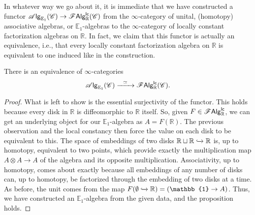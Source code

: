 \documentclass[../text]{subfiles}
\begin{document}
\begin{construction}
    In whatever way we go about it, it is immediate that we have constructed a functor $\mathscr{A} \mathsf{lg}_{\mathbb{E}_1}(\mathscr{C}) \rightarrow \mathscr{F} \mathsf{Alg}^{\mathsf{lc}}_{\mathbb{R}} (\mathscr{C})$ from the $\infty$-category of unital, (homotopy) associative algebras, or $\mathbb{E}_1$-algebras to the $\infty$-category of locally constant factorization algebras on $\mathbb{R}$. In fact, we claim that this functor is actually an equivalence, i.e., that every locally constant factorization algebra on $\mathbb{R}$ is equivalent to one induced like in the construction.
\end{construction}

\begin{proposition}\label{prop:R_gives_E1}
    There is an equivalence of $\infty$-categories
    \begin{equation}
        \alg{\mathbb{E}_1}(\catC) \xrightarrow{\ \ \simeq \ \ } \lcfa_{\mathbb{R}} (\catC).
    \end{equation}
\end{proposition}

\begin{proof}
    What is left to show is the essential surjectivity of the functor. This holds because every disk in $\mathbb{R}$ is diffeomorphic to $\mathbb{R}$ itself. So, given $F \in \mathscr{F} \mathsf{Alg}^{\mathsf{lc}}_{\mathbb{R}}$, we can get an underlying object for our $\mathbb{E}_1$-algebra as $A = F(\mathbb{R})$. The previous observation and the local constancy then force the value on each disk to be equivalent to this. The space of embeddings of two disks $\mathbb{R} \sqcup \mathbb{R} \xhookrightarrow{} \mathbb{R}$ is, up to homotopy, equivalent to two points, which provide exactly the multiplication map $ A \otimes A \rightarrow A$ of the algebra and its opposite multiplication.  Associativity, up to homotopy, comes about exactly because all embeddings of any number of disks can, up to homotopy, be factorized through the embedding of two disks at a time. As before, the unit comes from the map $F(\emptyset \xhookrightarrow{} \mathbb{R}) = (\mathbb{1} \rightarrow A)$. Thus, we have constructed an $\mathbb{E}_1$-algebra from the given data, and the proposition holds.
\end{proof}
\end{document}
